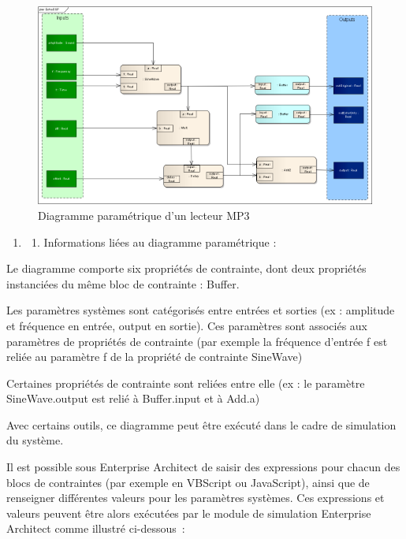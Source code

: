 \documentclass[12pt,a4paper]{report}
\begin{document}
\begin{figure}[H]
	\centering
	\includegraphics[width=0.8\linewidth]{image17.png}
	\caption{Diagramme paramétrique d'un lecteur MP3}
	
\end{figure}

\noindent \begin{flushleft}
	
\end{flushleft}

\noindent \begin{enumerate}
	\item \begin{enumerate}
		\item Informations li\'{e}es au diagramme param\'{e}trique :
	\end{enumerate}
\end{enumerate}

\noindent \begin{flushleft}
	Le diagramme comporte six propri\'{e}t\'{e}s de contrainte, dont deux propri\'{e}t\'{e}s instanci\'{e}es du m\^{e}me bloc de contrainte : Buffer.
	
	\noindent Les param\`{e}tres syst\`{e}mes sont cat\'{e}goris\'{e}s entre entr\'{e}es et sorties (ex : amplitude et fr\'{e}quence en entr\'{e}e, output en sortie). Ces param\`{e}tres sont associ\'{e}s aux param\`{e}tres de propri\'{e}t\'{e}s de contrainte (par exemple la fr\'{e}quence d'entr\'{e}e f est reli\'{e}e au param\`{e}tre f de la propri\'{e}t\'{e} de contrainte SineWave)
	
	\noindent Certaines propri\'{e}t\'{e}s de contrainte sont reli\'{e}es entre elle (ex : le param\`{e}tre SineWave.output est reli\'{e} \`{a} Buffer.input et \`{a} Add.a)
	
	\noindent Avec certains outils, ce diagramme peut \^{e}tre ex\'{e}cut\'{e} dans le cadre de simulation du syst\`{e}me.
	
	\noindent Il est possible sous Enterprise Architect de saisir des expressions pour chacun des blocs de contraintes (par exemple en VBScript ou JavaScript), ainsi que de renseigner diff\'{e}rentes valeurs pour les param\`{e}tres syst\`{e}mes. Ces expressions et valeurs peuvent \^{e}tre alors ex\'{e}cut\'{e}es par le module de simulation Enterprise Architect comme illustr\'{e} ci-dessous~:
\end{flushleft}
\noindent 
\end{document}
